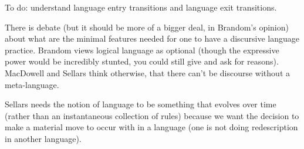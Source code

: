 To do: understand language entry transitions and language exit transitions.

There is debate (but it should be more of a bigger deal, in Brandom's opinion) about what are the minimal features needed for one to have a discursive language practice. Brandom views logical language as optional (though the expressive power would be incredibly stunted, you could still give and ask for reasons). MacDowell and Sellars think otherwise, that there can't be discourse without a meta-language.

Sellars needs the notion of language to be something that evolves over time (rather than an instantaneous collection of rules) because we want the decision to make a material move to occur with in a language (one is not doing redescription in another language).